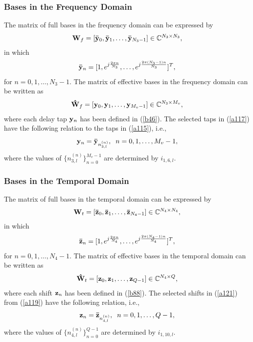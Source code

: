 \documentclass[lettersize,journal]{IEEEtran}
\begin{document}
\subsubsection{Bases in the Frequency Domain}
The matrix of full bases in the frequency domain can be expressed by 
\begin{equation}\label{a115}
{{\bf{W}}_f} = \left[ {{{{\bf{\bar y}}}_0},{{{\bf{\bar y}}}_1},\ldots,{{{\bf{\bar y}}}_{{N_3-1}}}} \right]\in \mathbb{C}^{N_3\times N_3},
\end{equation}
in which 
\begin{equation}
 {{{\bf{\bar y}}}_n} = {[1,{e^{j\frac{{2\pi n}}{{{N_3}}}}},\ldots,{e^{j\frac{{2\pi ({N_3} - 1)n}}{{{N_3}}}}}]^T}  , 
\end{equation}
for $n = 0,1,\ldots,{N_3} - 1$. The matrix of effective bases in the frequency domain can be written as
\begin{equation}\label{a117}
{{{\bf{\hat W}}}_f} = \left[ {{{\bf{y}}_0},{{\bf{y}}_1},\ldots,{{\bf{y}}_{{M_v} - 1}}} \right]\in \mathbb{C}^{N_3\times M_v},
\end{equation}
where each delay tap ${{\bf{y}}_n}$ has been defined in (\ref{b46}). The selected taps in (\ref{a117}) have the following relation to the taps in (\ref{a115}), i.e., 
\begin{equation}
{{\bf{y}}_n} = {{{\bf{\bar y}}}_{n_{3,l}^{(n)}}}, \;\; n=0,1,\ldots,M_v-1, 
\end{equation}
where the values of $\{{n_{3,l}^{(n)}}\}_{n=0}^{M_v-1}$ are determined by $i_{1,6,l}$.


\subsubsection{Bases in the Temporal Domain}
The  matrix of full bases  in the temporal domain can be expressed by 
\begin{equation}\label{a119}
{{\bf{W}}_t} = \left[ {{{{\bf{\bar z}}}_0},{{{\bf{\bar z}}}_1},\ldots,{{{\bf{\bar z}}}_{{N_4-1}}}} \right]\in \mathbb{C}^{N_4\times N_4},
\end{equation}
in which 
\begin{equation}
 {{{\bf{\bar z}}}_n} = {[1,{e^{j\frac{{2\pi n}}{{{N_4}}}}},\ldots,{e^{j\frac{{2\pi ({N_4} - 1)n}}{{{N_4}}}}}]^T}  , 
\end{equation}
for $n = 0,1,\ldots,{N_4} - 1$. The matrix of effective bases in the temporal domain can be written as
\begin{equation}\label{a121}
{{{\bf{\hat W}}}_t} = \left[ {{{\bf{z}}_0},{{\bf{z}}_1},\ldots,{{\bf{z}}_{Q - 1}}} \right]\in \mathbb{C}^{N_4\times Q},
\end{equation}
where each shift ${{\bf{z}}_n}$ has been defined in (\ref{b88}). The selected shifts in (\ref{a121}) from (\ref{a119}) have the following relation, i.e., 
\begin{equation}
{{\bf{z}}_n} = {{{\bf{\bar z}}}_{n_{4,l}^{(n)}}}, \;\; n=0,1,\ldots,Q-1, 
\end{equation}
where the values of $\{{n_{4,l}^{(n)}}\}_{n=0}^{Q-1}$ are determined by $i_{1,10,l}$.
\end{document}
